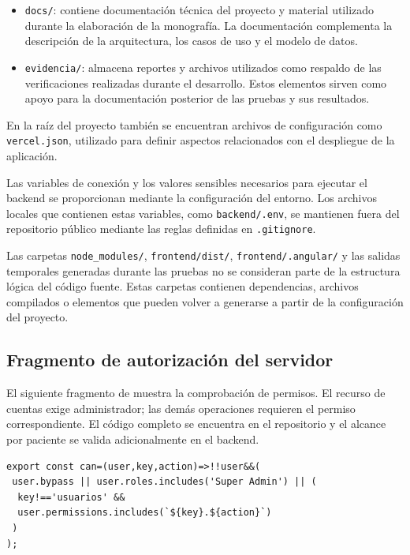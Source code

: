 \begin{itemize}
	\item \texttt{docs/}: contiene documentación técnica del proyecto y
	material utilizado durante la elaboración de la monografía. La
	documentación complementa la descripción de la arquitectura, los casos
	de uso y el modelo de datos.
	
	\item \texttt{evidencia/}: almacena reportes y archivos utilizados como
	respaldo de las verificaciones realizadas durante el desarrollo. Estos
	elementos sirven como apoyo para la documentación posterior de las
	pruebas y sus resultados.
	
\end{itemize}

En la raíz del proyecto también se encuentran archivos de configuración como
\texttt{vercel.json}, utilizado para definir aspectos relacionados con el
despliegue de la aplicación.

Las variables de conexión y los valores sensibles necesarios para ejecutar
el backend se proporcionan mediante la configuración del entorno. Los archivos
locales que contienen estas variables, como \texttt{backend/.env}, se
mantienen fuera del repositorio público mediante las reglas definidas en
\texttt{.gitignore}.

Las carpetas \texttt{node\_modules/}, \texttt{frontend/dist/},
\texttt{frontend/.angular/} y las salidas temporales generadas durante las
pruebas no se consideran parte de la estructura lógica del código fuente.
Estas carpetas contienen dependencias, archivos compilados o elementos que
pueden volver a generarse a partir de la configuración del proyecto.




\subsection{Fragmento de autorización del servidor}

El siguiente fragmento de  muestra la comprobación
de permisos. El recurso de cuentas exige administrador; las demás operaciones
requieren el permiso correspondiente. El código completo se encuentra en el
repositorio y el alcance por paciente se valida adicionalmente en el backend.

\begin{verbatim}
export const can=(user,key,action)=>!!user&&(
 user.bypass || user.roles.includes('Super Admin') || (
  key!=='usuarios' &&
  user.permissions.includes(`${key}.${action}`)
 )
);
\end{verbatim}

